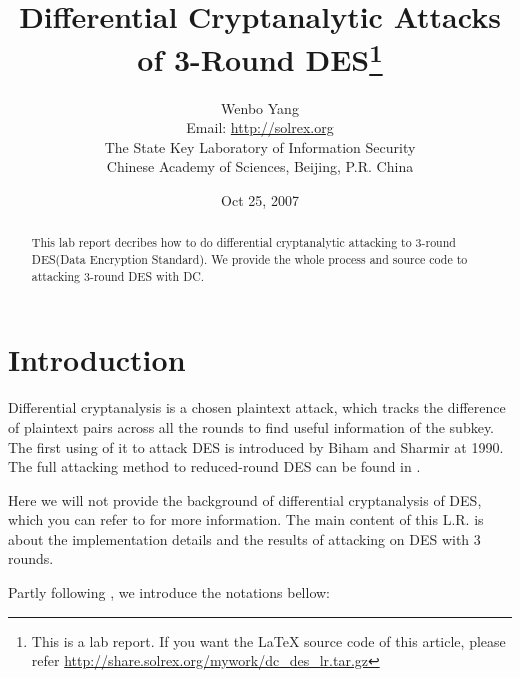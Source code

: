 \documentclass[a4paper,10pt]{article}
\begin{document}
\title{Differential Cryptanalytic Attacks of 3-Round DES\footnote{This is a lab report. If you want the \LaTeX{} source code of this article, please refer \url{http://share.solrex.org/mywork/dc_des_lr.tar.gz}}}
\author{Wenbo Yang\\Email: \url{http://solrex.org}\\The State Key Laboratory of Information Security\\Chinese Academy of Sciences, Beijing, P.R. China}
\date{Oct 25, 2007}
\maketitle

\setlength{\parskip}{1ex}

\begin{abstract}

This lab report decribes how to do differential cryptanalytic attacking to 3-round DES(Data Encryption Standard\cite{DES}). We provide the whole process and source code to attacking 3-round DES with DC.
 
\end{abstract}

\section{Introduction}

Differential cryptanalysis is a chosen plaintext attack, which tracks the difference of plaintext pairs across all the rounds to find useful information of the subkey. The first using of it to attack DES is introduced by Biham and Sharmir\cite{BIHA91} at 1990. The full attacking method to reduced-round DES can be found in \cite{BIHA93}.

Here we will not provide the background of differential cryptanalysis of DES, which you can refer to \cite{BIHA93} for more information. The main content of this L.R. is about the implementation details and the results of attacking on DES with 3 rounds.

Partly following \cite{BIHA91}, we introduce the notations bellow:
\end{document}
